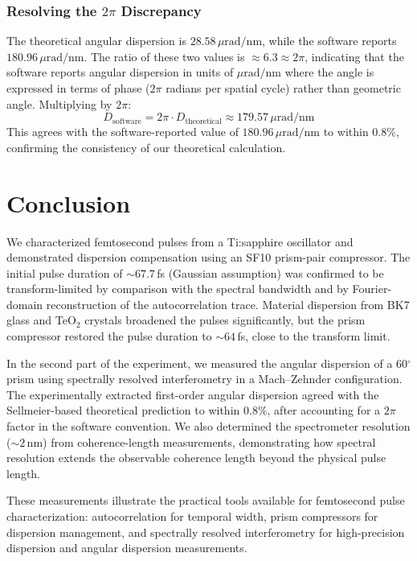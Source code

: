 \documentclass[twocolumn,10pt,a4paper]{article}
\begin{document}
\subsubsection{Resolving the $2\pi$ Discrepancy}
The theoretical angular dispersion is $28.58\,\mu\text{rad/nm}$, while the software reports $180.96\,\mu\text{rad/nm}$. The ratio of these two values is $\approx 6.3 \approx 2\pi$, indicating that the software reports angular dispersion in units of $\mu\text{rad/nm}$ where the angle is expressed in terms of phase ($2\pi$ radians per spatial cycle) rather than geometric angle. Multiplying by $2\pi$:
\begin{equation}
    D_{\mathrm{software}} = 2\pi \cdot D_{\mathrm{theoretical}} \approx 179.57\,\mu\text{rad/nm}
\end{equation}
This agrees with the software-reported value of $180.96\,\mu\text{rad/nm}$ to within $0.8\%$, confirming the consistency of our theoretical calculation.

\section{Conclusion}

We characterized femtosecond pulses from a Ti:sapphire oscillator and demonstrated dispersion compensation using an SF10 prism-pair compressor. The initial pulse duration of $\sim 67.7$\,fs (Gaussian assumption) was confirmed to be transform-limited by comparison with the spectral bandwidth and by Fourier-domain reconstruction of the autocorrelation trace. Material dispersion from BK7 glass and TeO$_2$ crystals broadened the pulses significantly, but the prism compressor restored the pulse duration to $\sim 64$\,fs, close to the transform limit.

In the second part of the experiment, we measured the angular dispersion of a 60$^\circ$ prism using spectrally resolved interferometry in a Mach--Zehnder configuration. The experimentally extracted first-order angular dispersion agreed with the Sellmeier-based theoretical prediction to within $0.8\%$, after accounting for a $2\pi$ factor in the software convention. We also determined the spectrometer resolution ($\sim 2$\,nm) from coherence-length measurements, demonstrating how spectral resolution extends the observable coherence length beyond the physical pulse length.

These measurements illustrate the practical tools available for femtosecond pulse characterization: autocorrelation for temporal width, prism compressors for dispersion management, and spectrally resolved interferometry for high-precision dispersion and angular dispersion measurements.
\end{document}
